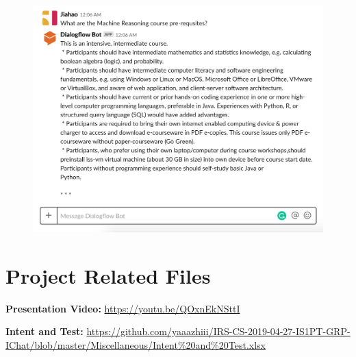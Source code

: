 		\begin{figure}[H]
			\centering
			\includegraphics[width=\linewidth, frame]{img/scenario_2_4.png}
		\end{figure}



\chapter{Project Related Files} %
\label{sub:project_related_files}
	\textbf{Presentation Video:} \url{https://youtu.be/QOxnEkNSttI}

	\textbf{Intent and Test:} \url{https://github.com/yaaazhiii/IRS-CS-2019-04-27-IS1PT-GRP-IChat/blob/master/Miscellaneous/Intent%20and%20Test.xlsx}



